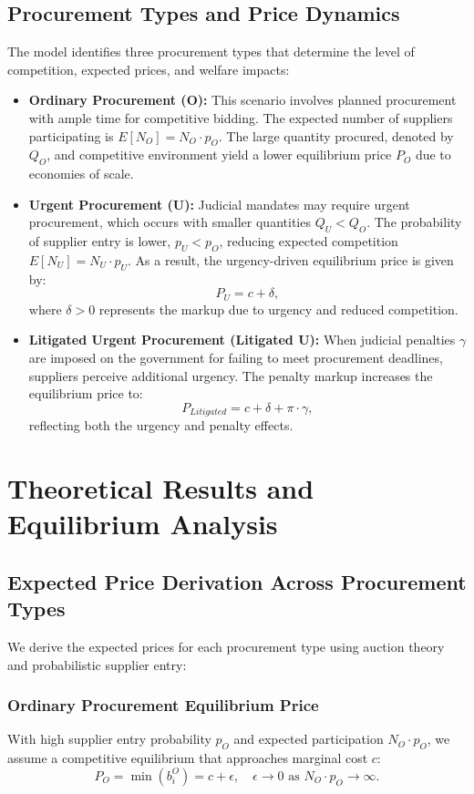 \documentclass[12pt]{article}
\begin{document}
\subsection{Procurement Types and Price Dynamics}
The model identifies three procurement types that determine the level of competition, expected prices, and welfare impacts:
\begin{itemize}
    \item \textbf{Ordinary Procurement (O):} This scenario involves planned procurement with ample time for competitive bidding. The expected number of suppliers participating is \( E[N_O] = N_O \cdot p_O \). The large quantity procured, denoted by \( Q_O \), and competitive environment yield a lower equilibrium price \( P_O \) due to economies of scale.
    
    \item \textbf{Urgent Procurement (U):} Judicial mandates may require urgent procurement, which occurs with smaller quantities \( Q_U < Q_O \). The probability of supplier entry is lower, \( p_U < p_O \), reducing expected competition \( E[N_U] = N_U \cdot p_U \). As a result, the urgency-driven equilibrium price is given by:
    \[
    P_U = c + \delta,
    \]
    where \( \delta > 0 \) represents the markup due to urgency and reduced competition.
    
    \item \textbf{Litigated Urgent Procurement (Litigated U):} When judicial penalties \( \gamma \) are imposed on the government for failing to meet procurement deadlines, suppliers perceive additional urgency. The penalty markup increases the equilibrium price to:
    \[
    P_{Litigated} = c + \delta + \pi \cdot \gamma,
    \]
    reflecting both the urgency and penalty effects.
\end{itemize}

\section{Theoretical Results and Equilibrium Analysis}

\subsection{Expected Price Derivation Across Procurement Types}
We derive the expected prices for each procurement type using auction theory and probabilistic supplier entry:

\subsubsection{Ordinary Procurement Equilibrium Price}
With high supplier entry probability \( p_O \) and expected participation \( N_O \cdot p_O \), we assume a competitive equilibrium that approaches marginal cost \( c \):
\[
P_O = \min(b_i^{O}) = c + \epsilon, \quad \epsilon \to 0 \text{ as } N_O \cdot p_O \to \infty.
\]
\end{document}
